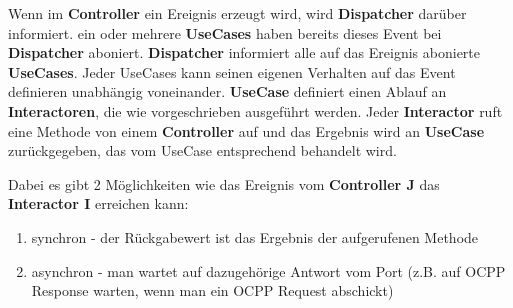 \documentclass{article}
\begin{document}
    Wenn im \textbf{Controller} ein Ereignis erzeugt wird, wird \textbf{Dispatcher} darüber informiert. ein
    oder mehrere \textbf{UseCases} haben bereits dieses Event bei \textbf{Dispatcher} aboniert.
    \textbf{Dispatcher} informiert alle auf das Ereignis abonierte \textbf{UseCases}. 
    Jeder UseCases kann seinen eigenen Verhalten auf das Event definieren unabhängig voneinander.
    \textbf{UseCase} definiert einen Ablauf an \textbf{Interactoren},
    die wie vorgeschrieben ausgeführt werden. Jeder \textbf{Interactor} ruft eine Methode von einem \textbf{Controller} auf 
    und das Ergebnis wird an \textbf{UseCase} zurückgegeben, das vom UseCase entsprechend behandelt wird.

    \newpage
    Dabei es gibt 2 Möglichkeiten wie das Ereignis vom \textbf{Controller J} das \textbf{Interactor I} erreichen kann:
    \begin{enumerate}
        \item synchron - der Rückgabewert ist das Ergebnis der aufgerufenen Methode 
        \item asynchron - man wartet auf dazugehörige Antwort vom Port (z.B. auf OCPP Response warten, wenn man ein OCPP Request abschickt)
    \end{enumerate}
\end{document}

